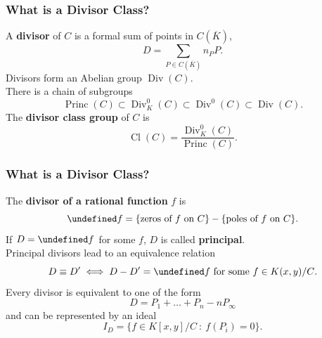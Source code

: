 \documentclass{beamer}
\let\div\undefined
\newcommand{\defn}{\textbf}
\newcommand{\bb}[1]{\mathbb{#1}}
\DeclareMathOperator{\Cl}{Cl}
\DeclareMathOperator{\div}{div}
\DeclareMathOperator{\Div}{Div}
\DeclareMathOperator{\Princ}{Princ}
\renewcommand{\bar}{\overline}
\begin{document}

\begin{frame}
\frametitle{What is a Divisor Class?}
  A \defn{divisor} of $C$ is a formal sum of points in $C(\bar K)$,
  \[ D = \sum_{P \in C(\bar K)} n_P P. \]
  Divisors form an Abelian group $\Div(C)$.\\
  \vspace{10pt}
  There is a chain of subgroups
  \[ \Princ(C) \subset \Div_K^0(C) \subset \Div^0(C) \subset \Div(C).\]
  The \defn{divisor class group} of $C$ is
  \[ \Cl(C) = \frac{\Div_K^0(C)}{\Princ(C)}.\]
\end{frame}


\begin{frame}
\frametitle{What is a Divisor Class?}
  The \defn{divisor of a rational function} $f$ is
  \[ \div f = \{ \text{zeros of $f$ on $C$} \} - \{ \text{poles of $f$ on $C$} \}.\]
  If $D = \div f$ for some $f$, $D$ is called \defn{principal}.\\
  Principal divisors lead to an equivalence relation
  \[ D \equiv D' \iff D - D' = \div f \text{ for some $f \in K(x,y)/C$}.\]
  Every divisor is equivalent to one of the form
  \[ D = P_1 + \dots + P_n - nP_\infty \]
  and can be represented by an ideal
  \[ I_D = \{ f \in K[x,y]/C ~:~ f(P_i) = 0 \}. \]
\end{frame}
\end{document}
